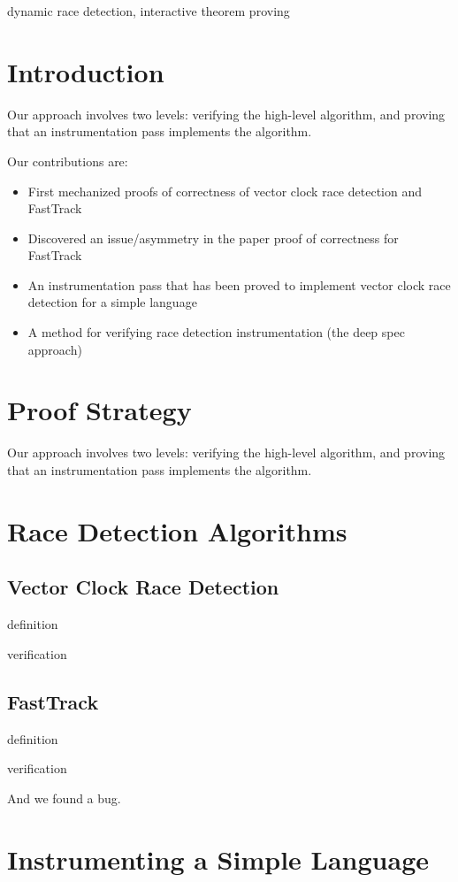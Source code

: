 \documentclass[preprint, 10pt]{sigplanconf}
\begin{document}
\keywords
dynamic race detection, interactive theorem proving

\section{Introduction}

Our approach involves two levels: verifying the high-level algorithm, and proving that an instrumentation pass implements the algorithm.

Our contributions are:
\begin{itemize}
\item First mechanized proofs of correctness of vector clock race detection and FastTrack
\item Discovered an issue/asymmetry in the paper proof of correctness for FastTrack
\item An instrumentation pass that has been proved to implement vector clock race detection for a simple language
\item A method for verifying race detection instrumentation (the deep spec approach)
\end{itemize}

\section{Proof Strategy}
Our approach involves two levels: verifying the high-level algorithm, and proving that an instrumentation pass implements the algorithm.

\section{Race Detection Algorithms}
\subsection{Vector Clock Race Detection}
definition

verification

\subsection{FastTrack}
definition

verification

And we found a bug.

\section{Instrumenting a Simple Language}
\end{document}
